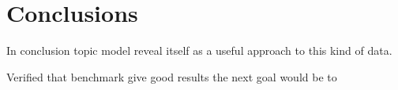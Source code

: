 \chapter{Conclusions}\label{ch:conclusions}
In conclusion topic model reveal itself as a useful approach to this kind of data.

Verified that benchmark give good results the next goal would be to 

